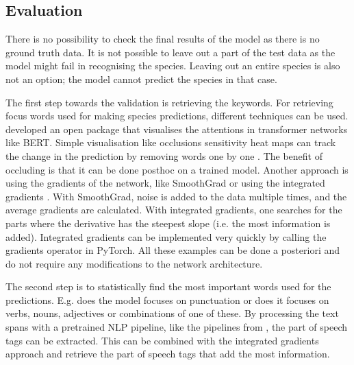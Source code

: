 \documentclass[a4paper, 12pt, oneside]{book} %
\begin{document}

\subsection{Evaluation}
There is no possibility to check the final results of the model as there is no ground truth data.
It is not possible to leave out a part of the test data as the model might fail in recognising the species.
Leaving out an entire species is also not an option; the model cannot predict the species in that case.

The first step towards the validation is retrieving the keywords.
For retrieving focus words used for making species predictions, different techniques can be used.
\textcite{vig_multiscale_2019} developed an open package that visualises the attentions in transformer networks like BERT.
Simple visualisation like occlusions sensitivity heat maps can track the change in the prediction by removing words one by one \autocite{fleet_visualizing_2014}.
The benefit of occluding is that it can be done posthoc on a trained model.
Another approach is using the gradients of the network, like SmoothGrad \autocite{smilkov_smoothgrad_2017} or using the integrated gradients \autocite{sundararajan_axiomatic_2017}.
With SmoothGrad, noise is added to the data multiple times, and the average gradients are calculated.
With integrated gradients, one searches for the parts where the derivative has the steepest slope (i.e. the most information is added).
Integrated gradients can be implemented very quickly by calling the gradients operator in PyTorch.
All these examples can be done a posteriori and do not require any modifications to the network architecture.

The second step is to statistically find the most important words used for the predictions. 
E.g. does the model focuses on punctuation or does it focuses on verbs, nouns, adjectives or combinations of one of these.
By processing the text spans with a pretrained NLP pipeline, like the pipelines from \textcite{honnibal_spacy_2020}, the part of speech tags can be extracted.
This can be combined with the integrated gradients approach and retrieve the part of speech tags that add the most information.
\end{document}
